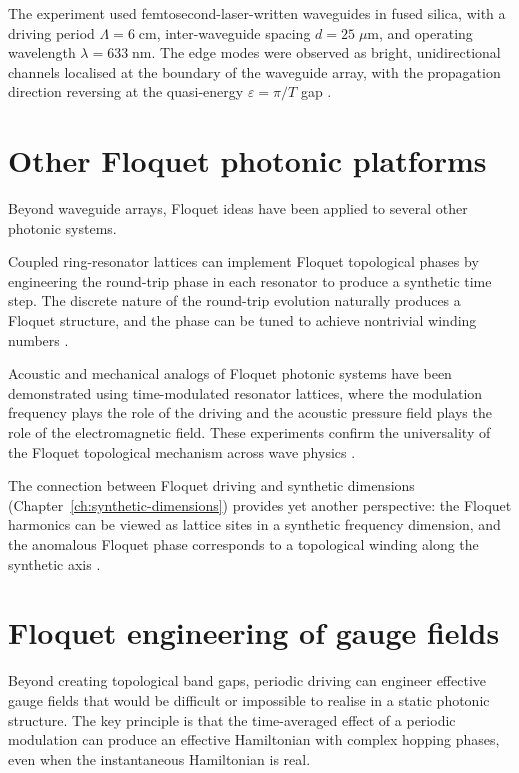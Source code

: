 The experiment used femtosecond-laser-written waveguides in fused
silica, with a driving period $\Lambda=6\;\mathrm{cm}$, inter-waveguide
spacing $d=25\;\mu\mathrm{m}$, and operating wavelength
$\lambda=633\;\mathrm{nm}$.  The edge modes were observed as
bright, unidirectional channels localised at the boundary of the
waveguide array, with the propagation direction reversing at the
quasi-energy $\varepsilon=\pi/T$ gap
\cite{maczewsky2017observation,price2022roadmap}.

\section{Other Floquet photonic platforms}
\label{sec:ch13-other-platforms}

Beyond waveguide arrays, Floquet ideas have been applied to several
other photonic systems.

Coupled ring-resonator lattices can implement Floquet topological
phases by engineering the round-trip phase in each resonator to
produce a synthetic time step.  The discrete nature of the round-trip
evolution naturally produces a Floquet structure, and the phase can
be tuned to achieve nontrivial winding numbers
\cite{ozawa2018topological}.

Acoustic and mechanical analogs of Floquet photonic systems have been
demonstrated using time-modulated resonator lattices, where the
modulation frequency plays the role of the driving and the acoustic
pressure field plays the role of the electromagnetic field.  These
experiments confirm the universality of the Floquet topological
mechanism across wave physics \cite{price2022roadmap}.

The connection between Floquet driving and synthetic dimensions
(Chapter~\ref{ch:synthetic-dimensions}) provides yet another
perspective: the Floquet harmonics can be viewed as lattice sites
in a synthetic frequency dimension, and the anomalous Floquet phase
corresponds to a topological winding along the synthetic axis
\cite{ozawa2018topological}.

\section{Floquet engineering of gauge fields}
\label{sec:ch13-gauge-engineering}

Beyond creating topological band gaps, periodic driving can engineer
effective gauge fields that would be difficult or impossible to
realise in a static photonic structure.  The key principle is that
the time-averaged effect of a periodic modulation can produce an
effective Hamiltonian with complex hopping phases, even when the
instantaneous Hamiltonian is real.

